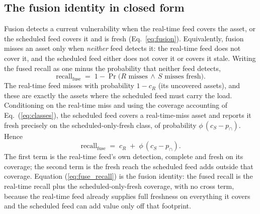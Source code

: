 \documentclass[journal]{IEEEtran}
\begin{document}
\subsection{The fusion identity in closed form}
Fusion detects a current vulnerability when the real-time feed covers the asset, or the scheduled
feed covers it and is fresh (Eq.~\ref{eq:fusion}). Equivalently, fusion misses an asset only when
\emph{neither} feed detects it: the real-time feed does not cover it, and the scheduled feed either
does not cover it or covers it stale. Writing the fused recall as one minus the probability that
neither feed detects,
\begin{equation}
\mathrm{recall}_{\text{fuse}}
\;=\; 1 - \Pr\!\big(R\text{ misses}\,\wedge\, S\text{ misses fresh}\big).
\label{eq:fuse_complement}
\end{equation}
The real-time feed misses with probability $1 - c_R$ (its uncovered assets), and these are exactly
the assets where the scheduled feed must carry the load. Conditioning on the real-time miss and
using the coverage accounting of Eq.~(\ref{eq:classes}), the scheduled feed covers a real-time-miss
asset and reports it fresh precisely on the scheduled-only-fresh class, of probability
$\phi\,(c_S - p_{\cap})$. Hence
\begin{equation}
\mathrm{recall}_{\text{fuse}}
\;=\; c_R \;+\; \phi\,(c_S - p_{\cap}).
\label{eq:fuse_recall}
\end{equation}
The first term is the real-time feed's own detection, complete and fresh on its coverage; the
second term is the fresh reach the scheduled feed adds outside that coverage. Equation
(\ref{eq:fuse_recall}) is the fusion identity: the fused recall is the real-time recall plus the
scheduled-only-fresh coverage, with no cross term, because the real-time feed already supplies full
freshness on everything it covers and the scheduled feed can add value only off that footprint.
\end{document}
